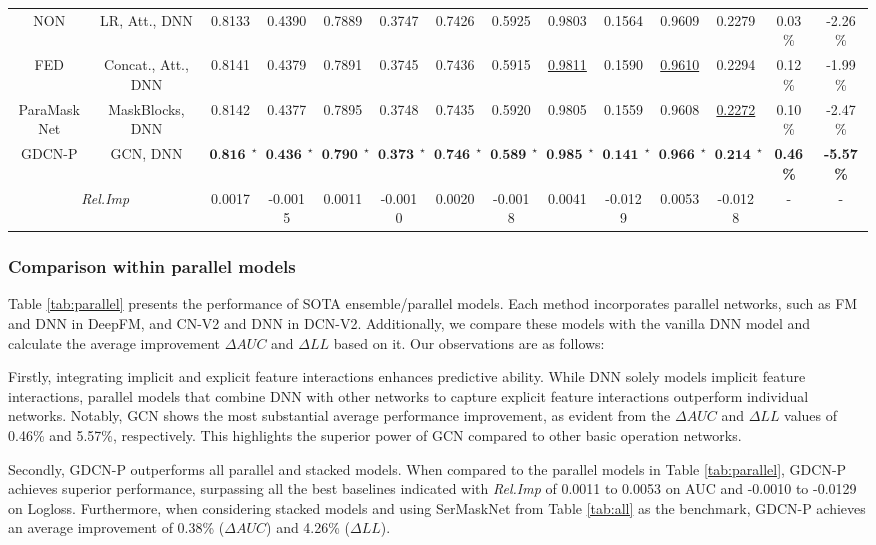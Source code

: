 \documentclass[sigconf]{acmart}
\begin{document}
\begin{table*}
{\begin{tabular}{cc|cc|cc|cc|cc|cc|cc}
\hline
NON&LR, Att., DNN  & 0.8133 & 0.4390 & 0.7889 & 0.3747&0.7426 & 0.5925 & 0.9803 & 0.1564 &0.9609	&0.2279 &  0.03\%	&-2.26\%  \\
FED&Concat., Att.,  DNN & 0.8141 & 0.4379 & 0.7891 & 0.3745&0.7436 & 0.5915&\underline{0.9811} & 0.1590 & \underline{0.9610} & 0.2294 & 0.12\%	&-1.99\%  \\ 
ParaMaskNet&MaskBlocks, DNN &0.8142&0.4377  &0.7895 & 0.3748  &0.7435& 0.5920  &0.9805 &0.1559   &0.9608 &\underline{0.2272}   &0.10\% 	&-2.47\%\\
\hline
GDCN-P&GCN, DNN &$\textbf{0.8161}^{\star}$ & $\textbf{0.4360}^{\star}$ & $\textbf{0.7909}^{\star}$ &$ \textbf{0.3733}^{\star}$&$\textbf{0.7462}^{\star}$ &$\textbf{0.5893}^{\star}$&$\textbf{0.9852}^{\star}$ & $\textbf{0.1410}^{\star}$ & $\textbf{0.9663}^{\star}$ & $\textbf{0.2144}^{\star}$ &  \textbf{0.46\%}	&\textbf{-5.57\%}  \\
\multicolumn{2}{c|}{\textit{Rel.Imp}}  & 0.0017 & -0.0015 & 0.0011 & -0.0010 &0.0020&-0.0018& 0.0041 & -0.0129 & 0.0053 & -0.0128 &- & -\\


\hline
\bottomrule
\end{tabular}
}
\end{table*}

\subsubsection{Comparison within parallel models}
Table \ref{tab:parallel} presents the performance of SOTA ensemble/parallel models. Each method incorporates parallel networks, such as FM and DNN in DeepFM, and CN-V2 and DNN in DCN-V2. Additionally, we compare these models with the vanilla DNN model and calculate the average improvement $\Delta{AUC}$ and $\Delta{LL}$ based on it. Our observations are as follows:

Firstly, integrating implicit and explicit feature interactions enhances predictive ability. While DNN solely models implicit feature interactions, parallel models that combine DNN with other networks to capture explicit feature interactions outperform individual networks. Notably, GCN shows the most substantial average performance improvement, as evident from the $\Delta{AUC}$ and $\Delta{LL}$ values of 0.46\% and 5.57\%, respectively. This highlights the superior power of GCN compared to other basic operation networks.
 

Secondly, GDCN-P outperforms all parallel and stacked models. When compared to the parallel models in Table \ref{tab:parallel}, GDCN-P achieves superior performance, surpassing all the best baselines indicated with \textit{Rel.Imp} of 0.0011 to 0.0053 on AUC and -0.0010 to -0.0129 on Logloss. Furthermore, when considering stacked models and using SerMaskNet from Table \ref{tab:all} as the benchmark, GDCN-P achieves an average improvement of 0.38\% ($\Delta{AUC}$) and 4.26\% ($\Delta{LL}$).
\end{document}
